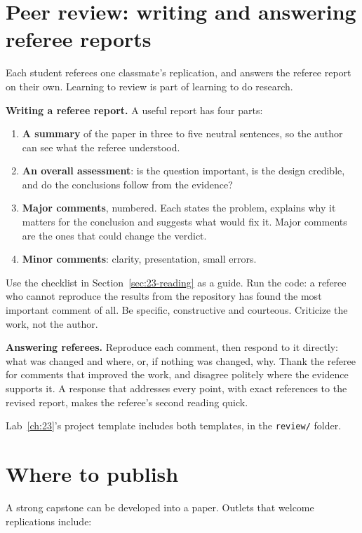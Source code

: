 \section{Peer review: writing and answering referee reports}
\label{sec:23-review}

Each student referees one classmate's replication, and answers the referee report on their own. Learning to review is part of learning to do research.

\textbf{Writing a referee report.} A useful report has four parts:

\begin{enumerate}
  \item \textbf{A summary} of the paper in three to five neutral sentences, so the author can see what the referee understood.
  \item \textbf{An overall assessment}: is the question important, is the design credible, and do the conclusions follow from the evidence?
  \item \textbf{Major comments}, numbered. Each states the problem, explains why it matters for the conclusion and suggests what would fix it. Major comments are the ones that could change the verdict.
  \item \textbf{Minor comments}: clarity, presentation, small errors.
\end{enumerate}

Use the checklist in Section~\ref{sec:23-reading} as a guide. Run the code: a referee who cannot reproduce the results from the repository has found the most important comment of all. Be specific, constructive and courteous. Criticize the work, not the author.

\textbf{Answering referees.} Reproduce each comment, then respond to it directly: what was changed and where, or, if nothing was changed, why. Thank the referee for comments that improved the work, and disagree politely where the evidence supports it. A response that addresses every point, with exact references to the revised report, makes the referee's second reading quick.

Lab~\ref{ch:23}'s project template includes both templates, in the \texttt{review/} folder.

\section{Where to publish}
\label{sec:23-publish}

A strong capstone can be developed into a paper. Outlets that welcome replications include:

